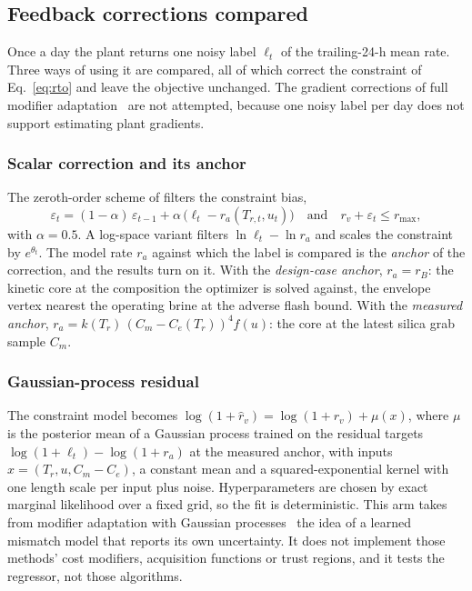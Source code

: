 \subsection{Feedback corrections compared}\label{sec:feedback}

Once a day the plant returns one noisy label $\ell_t$ of the
trailing-24-h mean rate. Three ways of using it are compared, all of
which correct the constraint of Eq.~\eqref{eq:rto} and leave the
objective unchanged. The gradient corrections of full modifier
adaptation~\citep{marchetti2009modifier,marchetti2010dual} are not
attempted, because one noisy label per day does not support estimating
plant gradients.

\subsubsection{Scalar correction and its anchor}\label{sec:anchor}

The zeroth-order scheme of \citet{chachuat2008constraint} filters the
constraint bias,
\begin{equation}\label{eq:ca}
\varepsilon_t = (1-\alpha)\,\varepsilon_{t-1}
 + \alpha\,\big(\ell_t - r_a(T_{r,t}, u_t)\big)
\quad \text{and} \quad
r_v + \varepsilon_t \le r_{\max},
\end{equation}
with $\alpha = 0.5$. A log-space variant filters
$\ln \ell_t - \ln r_a$ and scales the constraint by $e^{\theta_t}$. The
model rate $r_a$ against which the label is compared is the
\emph{anchor} of the correction, and the results turn on it. With the
\emph{design-case anchor}, $r_a = r_B$: the kinetic core at the
composition the optimizer is solved against, the envelope vertex
nearest the operating brine at the adverse flash bound. With the
\emph{measured anchor}, $r_a = k(T_r)\,(C_m - C_e(T_r))^4 f(u)$: the
core at the latest silica grab sample $C_m$.

\subsubsection{Gaussian-process residual}\label{sec:gp}

The constraint model becomes $\log(1+\hat r_v) = \log(1+r_v) + \mu(x)$,
where $\mu$ is the posterior mean of a Gaussian process trained on the
residual targets $\log(1+\ell_t) - \log(1+r_a)$ at the measured anchor,
with inputs $x = (T_r, u, C_m - C_e)$, a constant mean and a
squared-exponential kernel with one length scale per input plus noise.
Hyperparameters are chosen by exact marginal likelihood over a fixed
grid, so the fit is deterministic. This arm takes from modifier
adaptation with Gaussian
processes~\citep{ferreira2018gpma,delriochanona2021tale} the idea of a
learned mismatch model that reports its own uncertainty. It does not
implement those methods' cost modifiers, acquisition functions or trust
regions, and it tests the regressor, not those algorithms.

